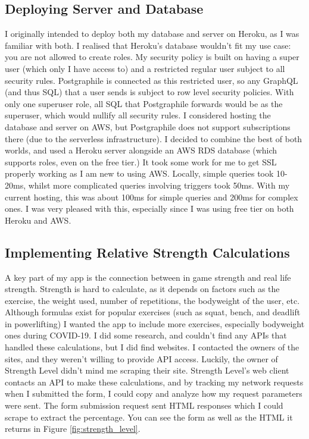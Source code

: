 \documentclass{l4proj}
\begin{document}
\subsection{Deploying Server and Database}
I originally intended to deploy both my database and server on Heroku, as I was familiar with both. I realised that Heroku's database wouldn't fit my use case: you are not allowed to create roles. My security policy is built on having a super user (which only I have access to) and a restricted regular user subject to all security rules. Postgraphile is connected as this restricted user, so any GraphQL (and thus SQL) that a user sends is subject to row level security policies. With only one superuser role, all SQL that Postgraphile forwards would be as the superuser, which would nullify all security rules. I considered hosting the database and server on AWS, but Postgraphile does not support subscriptions there (due to the serverless infrastructure). I decided to combine the best of both worlds, and used a Heroku server alongside an AWS RDS database (which supports roles, even on the free tier.) It took some work for me to get SSL properly working as I am new to using AWS. Locally, simple queries took 10-20ms, whilst more complicated queries involving triggers took 50ms. With my current hosting, this was about 100ms for simple queries and 200ms for complex ones. I was very pleased with this, especially since I was using free tier on both Heroku and AWS. 

\subsection{Implementing Relative Strength Calculations} \label{strength_calculations}
A key part of my app is the connection between in game strength and real life strength. Strength is hard to calculate, as it depends on factors such as the exercise, the weight used, number of repetitions, the bodyweight of the user, etc. Although formulas exist for popular exercises (such as squat, bench, and deadlift in powerlifting) I wanted the app to include more exercises, especially bodyweight ones during COVID-19. I did some research, and couldn't find any APIs that handled these calculations, but I did find websites. I contacted the owners of the sites, and they weren't willing to provide API access. Luckily, the owner of Strength Level didn't mind me scraping their site. Strength Level's web client contacts an API to make these calculations, and by tracking my network requests when I submitted the form, I could copy and analyze how my request parameters were sent. The form submission request sent HTML responses which I could scrape to extract the percentage. You can see the form as well as the HTML it returns in Figure \ref{fig:strength_level}.
\end{document}
